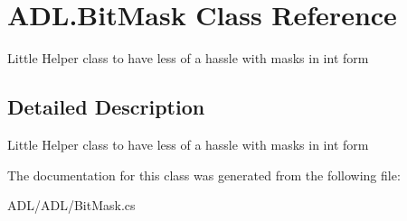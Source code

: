 \hypertarget{class_a_d_l_1_1_bit_mask}{}\section{A\+D\+L.\+Bit\+Mask Class Reference}
\label{class_a_d_l_1_1_bit_mask}


Little Helper class to have less of a hassle with masks in int form  




\subsection{Detailed Description}
Little Helper class to have less of a hassle with masks in int form 



The documentation for this class was generated from the following file\+:\begin{DoxyCompactItemize}
\item 
A\+D\+L/\+A\+D\+L/Bit\+Mask.\+cs\end{DoxyCompactItemize}
